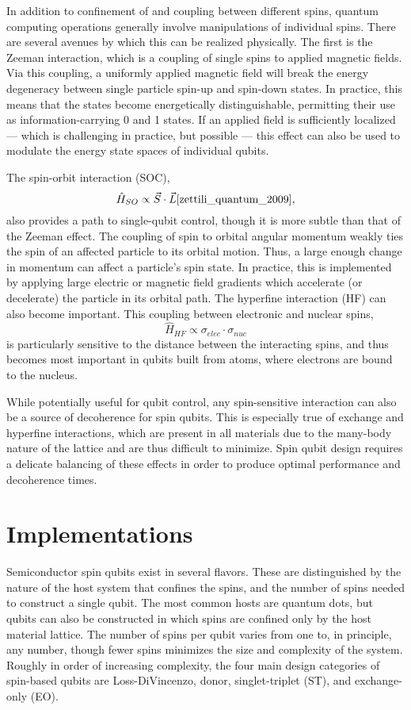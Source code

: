 \documentclass[aps,prl,twocolumn,superscriptaddress,groupedaddress]{revtex4}
\begin{document}
In addition to confinement of and coupling between different spins, quantum computing operations generally involve manipulations of individual spins. There are several avenues by which this can be realized physically. The first is the Zeeman interaction, which is a coupling of single spins to applied magnetic fields. Via this coupling, a uniformly applied magnetic field will break the energy degeneracy between single particle spin-up and spin-down states. In practice, this means that the states become energetically distinguishable, permitting their use as information-carrying 0 and 1 states. If an applied field is sufficiently localized — which is challenging in practice, but possible — this effect can also be used to modulate the energy state spaces of individual qubits.

The spin-orbit interaction (SOC),
\begin{equation}
\hat{H}_{SO}\propto \vec{S}\cdot \vec{L} \cite{zettili_quantum_2009},
\end{equation}
also provides a path to single-qubit control, though it is more subtle than that of the Zeeman effect. The coupling of spin to orbital angular momentum weakly ties the spin of an affected particle to its orbital motion. Thus, a large enough change in momentum can affect a particle’s spin state. In practice, this is implemented by applying large electric or magnetic field gradients which accelerate (or decelerate) the particle in its orbital path.
The hyperfine interaction (HF) can also become important. This coupling between electronic and nuclear spins,
\begin{equation}
\hat{H}_{HF}\propto \sigma_{elec} \cdot \sigma_{nuc}
\end{equation}
is particularly sensitive to the distance between the interacting spins, and thus becomes most important in qubits built from atoms, where electrons are bound to the nucleus.

While potentially useful for qubit control, any spin-sensitive interaction can also be a source of decoherence for spin qubits. This is especially true of exchange and hyperfine interactions, which are present in all materials due to the many-body nature of the lattice and are thus difficult to minimize. Spin qubit design requires a delicate balancing of these effects in order to produce optimal performance and decoherence times.

\section{Implementations}
Semiconductor spin qubits exist in several flavors. These are distinguished by the nature of the host system that confines the spins, and the number of spins needed to construct a single qubit. The most common hosts are quantum dots, but qubits can also be constructed in which spins are confined only by the host material lattice. The number of spins per qubit varies from one to, in principle, any number, though fewer spins minimizes the size and complexity of the system. Roughly in order of increasing complexity, the four main design categories of spin-based qubits are Loss-DiVincenzo, donor, singlet-triplet (ST), and exchange-only (EO).
\end{document}
